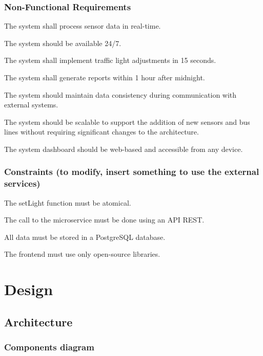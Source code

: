 \documentclass[12pt, a4paper, twoside, openright]{report}
\begin{document}
\subsection{Non-Functional Requirements}

\begin{non_functional_requirements}
\item
  The system shall process sensor data in real-time.
\item
  The system should be available 24/7.
\item
  The system shall implement traffic light adjustments in 15 seconds.
\item
  The system shall generate reports within 1 hour after midnight.
\item
  The system should maintain data consistency during communication with
  external systems.
\item
  The system should be scalable to support the addition of new sensors and bus lines 
  without requiring significant changes to the architecture.
\item
  The system dashboard should be web-based and accessible from any device.
\end{non_functional_requirements}

\subsection{Constraints (to modify, insert something to use the
external services)}

\begin{constraints}
\item
  The setLight function must be atomical.
\item
  The call to the microservice must be done using an API REST.
\item
 All data must be stored in a PostgreSQL database.
\item 
 The frontend must use only open-source libraries.
\end{constraints}

\chapter{Design}

\section{Architecture}
\subsection{Components diagram}
\end{document}
